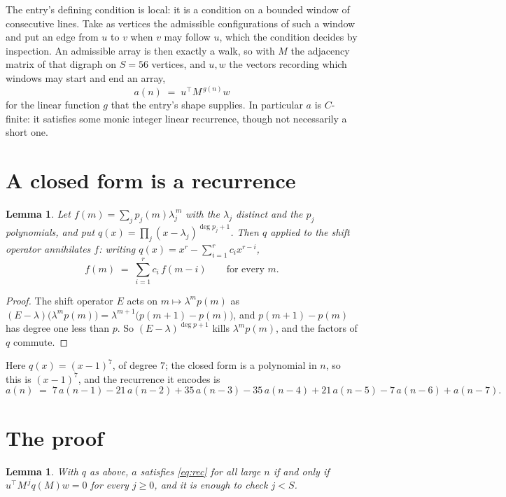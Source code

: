 \documentclass[11pt,a4paper]{article}
\theoremstyle{plain}
\newtheorem{lemma}[theorem]{Lemma}
\theoremstyle{definition}
\begin{document}
The entry's defining condition is local: it is a condition on a bounded window of consecutive lines. Take as vertices the
admissible configurations of such a window and put an edge from $u$ to $v$ when $v$ may
follow $u$, which the condition decides by inspection. An admissible array is then exactly a
walk, so with $M$ the adjacency matrix of that digraph on $S=56$ vertices, and $u,w$ the
vectors recording which windows may start and end an array,
\[
a(n)\;=\;u^{\!\top}M^{\,g(n)}w
\]
for the linear function $g$ that the entry's shape supplies. In particular $a$ is
$C$-finite: it satisfies some monic integer linear recurrence, though not necessarily a short
one.

\section{A closed form is a recurrence}

\begin{lemma}\label{lem:ann}
Let $f(m)=\sum_{j}p_j(m)\lambda_j^{\,m}$ with the $\lambda_j$ distinct and the $p_j$
polynomials, and put $q(x)=\prod_j(x-\lambda_j)^{\deg p_j+1}$. Then $q$ applied to the shift
operator annihilates $f$: writing $q(x)=x^{r}-\sum_{i=1}^{r}c_ix^{r-i}$,
\[
f(m)\;=\;\sum_{i=1}^{r}c_i\,f(m-i)\qquad\text{for every }m.
\]
\end{lemma}

\begin{proof}
The shift operator $E$ acts on $m\mapsto\lambda^{m}p(m)$ as
$(E-\lambda)\bigl(\lambda^{m}p(m)\bigr)=\lambda^{m+1}\bigl(p(m+1)-p(m)\bigr)$, and
$p(m+1)-p(m)$ has degree one less than $p$. So $(E-\lambda)^{\deg p+1}$ kills
$\lambda^{m}p(m)$, and the factors of $q$ commute.
\end{proof}

Here $q(x)=(x-1)^{7}$, of degree $7$; the closed form is a polynomial in $n$, so this is $(x-1)^{7}$, and the recurrence it encodes is
\begin{equation}\label{eq:rec}
a(n)\;=\;7\,a(n-1) - 21\,a(n-2) + 35\,a(n-3) - 35\,a(n-4) + 21\,a(n-5) - 7\,a(n-6) + a(n-7).
\end{equation}

\section{The proof}

\begin{lemma}\label{lem:crit}
With $q$ as above, $a$ satisfies \eqref{eq:rec} for all large $n$ if and only if
$u^{\!\top}M^{\,j}q(M)w=0$ for every $j\ge0$, and it is enough to check $j<S$.
\end{lemma}
\end{document}
